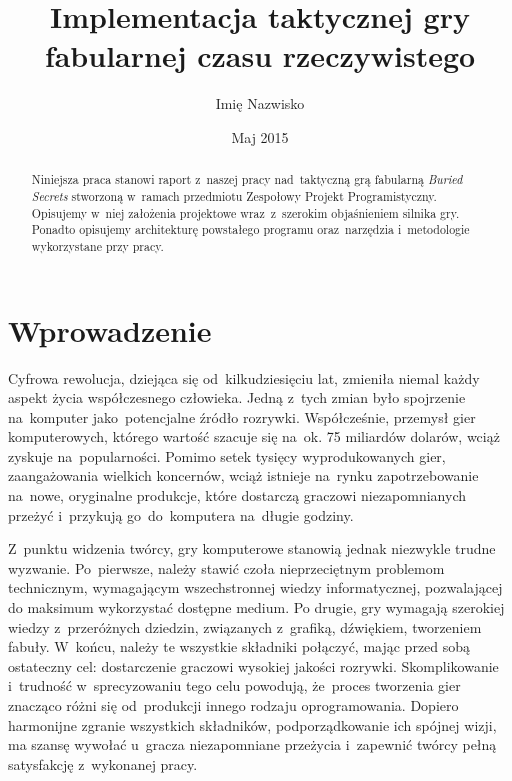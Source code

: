 \documentclass[licencjacka]{pracamgr}
\author	{Imię Nazwisko}
\title{Implementacja taktycznej gry fabularnej czasu rzeczywistego}
\date{Maj 2015}
\begin{document}
\maketitle

\begin{abstract}
  Niniejsza praca stanowi raport z~naszej pracy nad~taktyczną grą fabularną \emph{Buried Secrets} stworzoną w~ramach przedmiotu Zespołowy Projekt
  Programistyczny. Opisujemy w~niej założenia projektowe wraz~z~szerokim objaśnieniem silnika gry. Ponadto opisujemy architekturę 
  powstałego programu oraz~narzędzia i~metodologie wykorzystane przy pracy.
\end{abstract}

\tableofcontents

\chapter*{Wprowadzenie}
  Cyfrowa rewolucja, dziejąca się od~kilkudziesięciu lat, zmieniła niemal każdy aspekt życia współczesnego człowieka.
  Jedną z~tych zmian było spojrzenie na~komputer jako~potencjalne źródło rozrywki. Współcześnie, przemysł
  gier komputerowych, którego wartość szacuje się na~ok. 75 miliardów dolarów\cite{CA}, wciąż zyskuje na~popularności.
  Pomimo setek tysięcy wyprodukowanych gier, zaangażowania wielkich koncernów, wciąż istnieje na~rynku zapotrzebowanie
  na~nowe, oryginalne produkcje, które dostarczą graczowi niezapomnianych przeżyć i~przykują go~do~komputera na~długie godziny.

  Z~punktu widzenia twórcy, gry komputerowe stanowią jednak niezwykle trudne wyzwanie. Po~pierwsze, należy stawić czoła
  nieprzeciętnym problemom technicznym, wymagającym wszechstronnej wiedzy informatycznej, pozwalającej do maksimum wykorzystać
  dostępne medium. Po drugie, gry wymagają szerokiej wiedzy z~przeróżnych dziedzin, związanych
  z~grafiką, dźwiękiem, tworzeniem fabuły. W~końcu, należy te wszystkie składniki połączyć, mając przed sobą ostateczny cel: dostarczenie
  graczowi wysokiej jakości rozrywki. Skomplikowanie i~trudność w~sprecyzowaniu tego celu powodują, że~proces tworzenia gier
  znacząco różni się od~produkcji innego rodzaju oprogramowania. Dopiero harmonijne zgranie wszystkich składników, podporządkowanie
  ich spójnej wizji, ma szansę wywołać u~gracza niezapomniane przeżycia i~zapewnić twórcy pełną satysfakcję z~wykonanej pracy.
\end{document}

